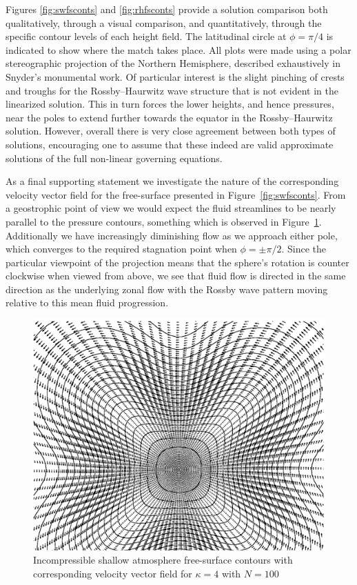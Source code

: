 Figures \ref{fig:swfsconts} and \ref{fig:rhfsconts} provide a solution comparison both qualitatively, through a visual comparison, and quantitatively, through the specific contour levels of each height field. The latitudinal circle at $\phi=\pi/4$ is indicated to show where the match takes place. All plots were made using a polar stereographic projection of the Northern Hemisphere, described exhaustively in Snyder's monumental work\cite{Snyder:MP}. Of particular interest is the slight pinching of crests and troughs for the Rossby--Haurwitz wave structure that is not evident in the linearized solution. This in turn forces the lower heights, and hence pressures, near the poles to extend further towards the equator in the Rossby--Haurwitz solution. However, overall there is very close agreement between both types of solutions, encouraging one to assume that these indeed are valid approximate solutions of the full non-linear governing equations.

As a final supporting statement we investigate the nature of the corresponding velocity vector field for the free-surface presented in Figure~\ref{fig:swfsconts}. From a geostrophic point of view we would expect the fluid streamlines to be nearly parallel to the pressure contours, something which is observed in Figure~\ref{fig:fsvelfield}. Additionally we have increasingly diminishing flow as we approach either pole, which converges to the required stagnation point when $\phi=\pm \pi/2$. Since the particular viewpoint of the projection means that the sphere's rotation is counter clockwise when viewed from above, we see that fluid flow is directed in the same direction as the underlying zonal flow with the Rossby wave pattern moving relative to this mean fluid progression.
\begin{figure}[htbp]
	\centering
		\includegraphics[scale=0.8]{IMAGES/fsvelfield.eps}
	\caption{Incompressible shallow atmosphere free-surface contours with corresponding velocity vector field for $\kappa=4$ with $N=100$}
	\label{fig:fsvelfield}
\end{figure}


